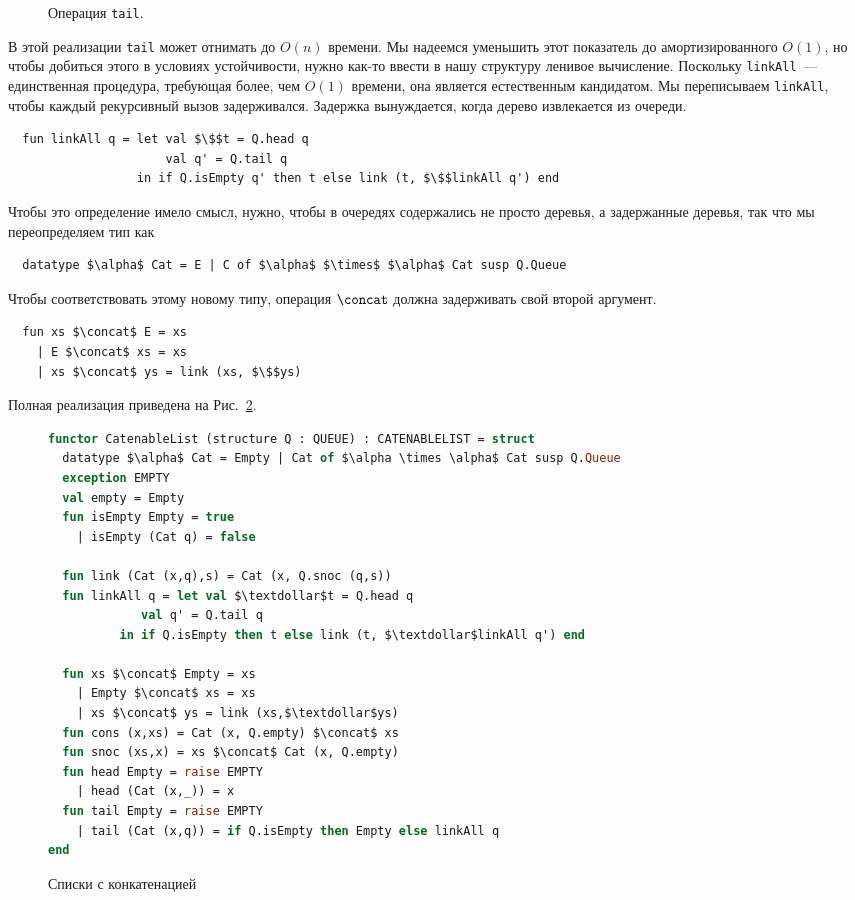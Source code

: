 \begin{figure}
  \centering
  
  \caption{Операция \lstinline!tail!.}
  \label{fig:10.5}
\end{figure}
В этой реализации \lstinline!tail! может отнимать до $O(n)$
времени. Мы надеемся уменьшить этот показатель до амортизированного
$O(1)$, но чтобы добиться этого в условиях устойчивости,
нужно как-то ввести в нашу структуру ленивое вычисление. Поскольку
\lstinline!linkAll!~--- единственная процедура, требующая более, чем
$O(1)$ времени, она является естественным кандидатом. Мы переписываем
\lstinline!linkAll!, чтобы каждый рекурсивный вызов
задерживался. Задержка вынуждается, когда дерево извлекается из
очереди.
\begin{lstlisting}
  fun linkAll q = let val $\$$t = Q.head q
                      val q' = Q.tail q
                  in if Q.isEmpty q' then t else link (t, $\$$linkAll q') end
\end{lstlisting}
Чтобы это определение имело смысл, нужно, чтобы в очередях содержались
не просто деревья, а задержанные деревья, так что мы переопределяем
тип как
\begin{lstlisting}
  datatype $\alpha$ Cat = E | C of $\alpha$ $\times$ $\alpha$ Cat susp Q.Queue
\end{lstlisting}
Чтобы соответствовать этому новому типу, операция $\concat$ должна
задерживать свой второй аргумент.
\begin{lstlisting}
  fun xs $\concat$ E = xs
    | E $\concat$ xs = xs
    | xs $\concat$ ys = link (xs, $\$$ys)
\end{lstlisting}
Полная реализация приведена на Рис.~\ref{fig:10.6}.

\begin{figure}
  \centering
\begin{lstlisting}[mathescape=true,language=ml]
functor CatenableList (structure Q : QUEUE) : CATENABLELIST = struct
  datatype $\alpha$ Cat = Empty | Cat of $\alpha \times \alpha$ Cat susp Q.Queue
  exception EMPTY
  val empty = Empty
  fun isEmpty Empty = true
    | isEmpty (Cat q) = false
    
  fun link (Cat (x,q),s) = Cat (x, Q.snoc (q,s))
  fun linkAll q = let val $\textdollar$t = Q.head q
		     val q' = Q.tail q
		  in if Q.isEmpty then t else link (t, $\textdollar$linkAll q') end

  fun xs $\concat$ Empty = xs
    | Empty $\concat$ xs = xs
    | xs $\concat$ ys = link (xs,$\textdollar$ys)
  fun cons (x,xs) = Cat (x, Q.empty) $\concat$ xs
  fun snoc (xs,x) = xs $\concat$ Cat (x, Q.empty)
  fun head Empty = raise EMPTY
    | head (Cat (x,_)) = x
  fun tail Empty = raise EMPTY
    | tail (Cat (x,q)) = if Q.isEmpty then Empty else linkAll q
end 
\end{lstlisting}
  \caption{Списки с конкатенацией}
  \label{fig:10.6}
\end{figure}

